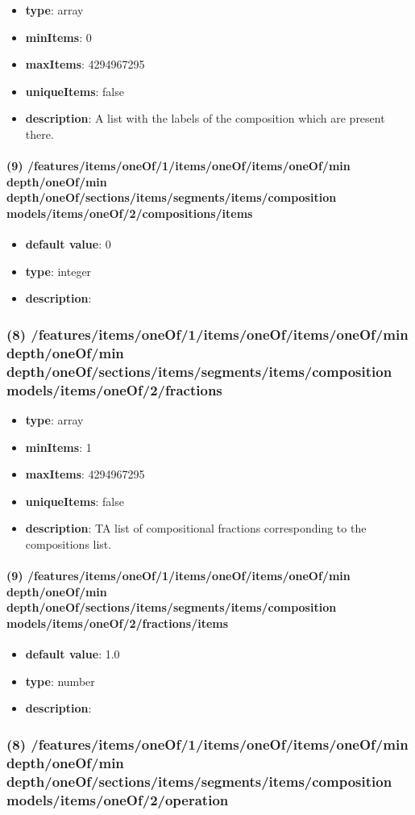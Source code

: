 \begin{itemize}[leftmargin=8em]\item {\bf type}: array
\item {\bf minItems}: 0
\item {\bf maxItems}: 4294967295
\item {\bf uniqueItems}: false
\item {\bf description}: A list with the labels of the composition which are present there.
\end{itemize}\paragraph{(9) /features/items/oneOf/1/items/oneOf/items/oneOf/min depth/oneOf/min depth/oneOf/sections/items/segments/items/composition models/items/oneOf/2/compositions/items}
\begin{itemize}[leftmargin=9em]\item {\bf default value}: 0
\item {\bf type}: integer
\item {\bf description}: 
\end{itemize}\subsubsection{(8) /features/items/oneOf/1/items/oneOf/items/oneOf/min depth/oneOf/min depth/oneOf/sections/items/segments/items/composition models/items/oneOf/2/fractions}
\begin{itemize}[leftmargin=8em]\item {\bf type}: array
\item {\bf minItems}: 1
\item {\bf maxItems}: 4294967295
\item {\bf uniqueItems}: false
\item {\bf description}: TA list of compositional fractions corresponding to the compositions list.
\end{itemize}\paragraph{(9) /features/items/oneOf/1/items/oneOf/items/oneOf/min depth/oneOf/min depth/oneOf/sections/items/segments/items/composition models/items/oneOf/2/fractions/items}
\begin{itemize}[leftmargin=9em]\item {\bf default value}: 1.0
\item {\bf type}: number
\item {\bf description}: 
\end{itemize}\subsubsection{(8) /features/items/oneOf/1/items/oneOf/items/oneOf/min depth/oneOf/min depth/oneOf/sections/items/segments/items/composition models/items/oneOf/2/operation}

